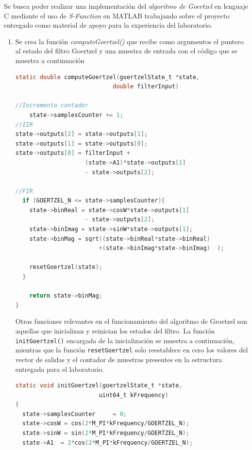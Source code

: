 Se busca poder realizar una implementación del \textit{algoritmo de Goertzel} en lenguaje C mediante el uso de \textit{S-Function} en MATLAB trabajando sobre el proyecto entregado como material de apoyo para la experiencia del laboratorio.


\begin{enumerate}
    \item Se crea la función \textit{computeGoertzel()} que recibe como argumentos el puntero al estado del filtro Goertzel y una muestra de entrada con el código que se muestra a continuación
    
    \begin{lstlisting}[language = C]
static double computeGoertzel(goertzelState_t *state,
                            double filterInput)

//Incrementa contador
	state->samplesCounter += 1;
//IIR
state->outputs[2] = state->outputs[1];
state->outputs[1] = state->outputs[0];
state->outputs[0] = filterInput + 
                    (state->A1)*state->outputs[1] 
                    - state->outputs[2];

//FIR
  if (GOERTZEL_N <= state->samplesCounter){
    state->binReal = state->cosW*state->outputs[1] 
                    - state->outputs[2];
    state->binImag = state->sinW*state->outputs[1];
    state->binMag = sqrt((state->binReal*state->binReal) 
                        +(state->binImag*state->binImag)  ); 

    resetGoertzel(state);
  }

	return state->binMag;
}

    \end{lstlisting}
    
    
    Otras funciones relevantes en el funcionamiento del algoritmo de Groetzel son aquellas que inicializan y reinician  los estados del filtro. La función \texttt{initGoertzel()} encargada de la inicialización se muestra a continuación, mientras que la función \texttt{resetGoertzel} solo reestablece en cero los valores del vector de salidas y el contador de muestras presentes en la estructura entregada para el laboratorio.
    
    \begin{lstlisting}[language = C]
static void initGoertzel(goertzelState_t *state, 
                        uint64_t kFrequency)
{
  state->samplesCounter 	= 0;
  state->cosW = cos(2*M_PI*kFrequency/GOERTZEL_N);
  state->sinW = sin(2*M_PI*kFrequency/GOERTZEL_N);
  state->A1  = 2*cos(2*M_PI*kFrequency/GOERTZEL_N);


\end{lstlisting}
\end{enumerate}
